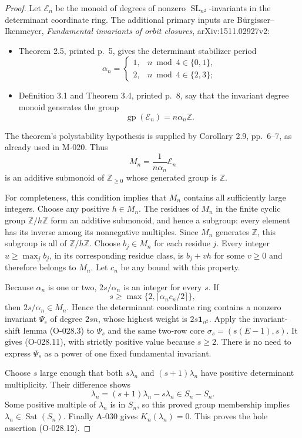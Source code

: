 \begin{proof}
Let \(\mathcal E_n\) be the monoid of degrees of nonzero
\(\operatorname{SL}_{n^2}\)-invariants in the determinant
coordinate ring.
The additional primary inputs are
B\"urgisser--Ikenmeyer, \emph{Fundamental invariants of orbit
closures}, arXiv:1511.02927v2:
\begin{itemize}
\item Theorem 2.5, printed p.~5, gives the determinant
stabilizer period
\[
 \alpha_n=
 \begin{cases}
  1,&n\bmod4\in\{0,1\},\\
  2,&n\bmod4\in\{2,3\};
 \end{cases}
\]
\item Definition 3.1 and Theorem 3.4, printed p.~8, say
that the invariant degree monoid generates the group
\[
                          \operatorname{gp}(\mathcal E_n)
                                    =n\alpha_n\mathbb Z.
\]
\end{itemize}
The theorem's polystability hypothesis is supplied by
Corollary 2.9, pp.~6--7, as already used in M-020.
Thus
\[
                    M_n=\frac1{n\alpha_n}\mathcal E_n
\]
is an additive submonoid of \(\mathbb Z_{\geq0}\) whose
generated group is \(\mathbb Z\).

For completeness, this condition implies that \(M_n\)
contains all sufficiently large integers.
Choose any positive \(h\in M_n\).
The residues of \(M_n\) in the finite cyclic group
\(\mathbb Z/h\mathbb Z\) form an additive submonoid,
and hence a subgroup: every element has its inverse
among its nonnegative multiples.
Since \(M_n\) generates \(\mathbb Z\), this subgroup is
all of \(\mathbb Z/h\mathbb Z\).
Choose \(b_j\in M_n\) for each residue \(j\).
Every integer \(u\geq\max_j b_j\), in its corresponding
residue class, is \(b_j+vh\) for some \(v\geq0\) and
therefore belongs to \(M_n\).
Let \(c_n\) be any bound with this property.

Because \(\alpha_n\) is one or two, \(2s/\alpha_n\)
is an integer for every \(s\).
If
\[
                  s\geq
             \max\{2,\lceil\alpha_n c_n/2\rceil\},
\]
then \(2s/\alpha_n\in M_n\).
Hence the determinant coordinate ring contains a
nonzero invariant \(\Psi_s\) of degree \(2sn\), whose
highest weight is \(2s\mathbf1_{n^2}\).
Apply the invariant-shift lemma (O-028.3) to
\(\Psi_s\) and the same two-row core
\(\sigma_s=(s(E-1),s)\).
It gives (O-028.11), with strictly positive value because
\(s\geq2\).
There is no need to express \(\Psi_s\) as a power of one
fixed fundamental invariant.

Choose \(s\) large enough that both \(s\lambda_n\) and
\((s+1)\lambda_n\) have positive determinant multiplicity.
Their difference shows
\[
                   \lambda_n=(s+1)\lambda_n-s\lambda_n
                                  \in S_n-S_n.
\]
Some positive multiple of \(\lambda_n\) is in \(S_n\),
so this proved group membership implies
\(\lambda_n\in\operatorname{Sat}(S_n)\).
Finally A-030 gives \(K_n(\lambda_n)=0\).
This proves the hole assertion (O-028.12).
\end{proof}

